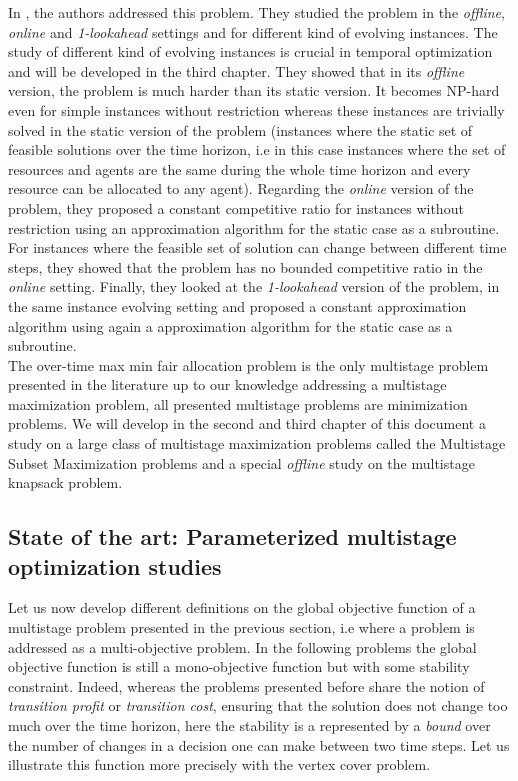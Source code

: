 \documentclass[a4paper]{book}
\begin{document}
In \cite{bampis2018fair}, the authors addressed this problem. They studied the problem in the \emph{offline}, \emph{online} and \emph{1-lookahead} settings and for different kind of evolving instances. The study of different kind of evolving instances is crucial in temporal optimization and will be developed in the third chapter. They showed that in its \emph{offline} version, the problem is much harder than its static version. It becomes NP-hard even for simple instances without restriction whereas these instances are trivially solved in the static version of the problem (instances where the static set of feasible solutions over the time horizon, i.e in this case instances where the set of resources and agents are the same during the whole time horizon and every resource can be allocated to any agent). Regarding the \emph{online} version of the problem, they proposed a constant competitive ratio for instances without restriction using an approximation algorithm for the static case as a subroutine. For instances where the feasible set of solution can change between different time steps, they showed that the problem has no bounded competitive ratio in the \emph{online} setting. Finally, they looked at the \emph{1-lookahead} version of the problem, in the same instance evolving setting and proposed a constant approximation algorithm using again a approximation algorithm for the static case as a subroutine. \\

The {\sc over-time max min fair allocation} problem is the only multistage problem presented in the literature up to our knowledge addressing a multistage maximization problem, all presented multistage problems are minimization problems. We will develop in the second and third chapter of this document a study on a large class of multistage maximization problems called the {\sc Multistage Subset Maximization} problems and a special \textit{offline} study on the {\sc multistage knapsack problem}.


\subsection{State of the art: Parameterized multistage optimization studies}
Let us now develop different definitions on the global objective function of a multistage problem presented in the previous section, i.e where a problem is addressed as a multi-objective problem. In the following problems the global objective function is still a mono-objective function but with some stability constraint. Indeed, whereas the problems presented before share the notion of \textit{transition profit} or \textit{transition cost}, ensuring that the solution does not change too much over the time horizon, here the stability is a represented by a \textit{bound} over the number of changes in a decision one can make between two time steps. Let us illustrate this function more precisely with the {\sc vertex cover} problem.
\end{document}
